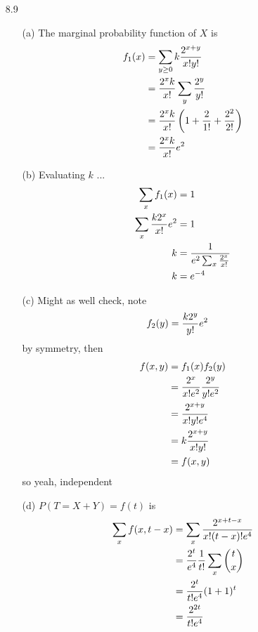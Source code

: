 \documentclass[english, 11pt]{article}
\begin{document}
\begin{itemize}
    \item[8.9]
    \begin{itemize}
      \item[(a)] The marginal probability function of $X$ is
      \begin{align*}
        f_1(x) & = \sum_{y \geq 0} k \frac{2^{x+y}}{x!y!} \\
               & = \frac{2^xk}{x!} \sum_y \frac{2^y}{y!} \\
               & = \frac{2^xk}{x!} \left( 1 + \frac{2}{1!} + \frac{2^2}{2!}  \right) \\
               & = \frac{2^xk}{x!} e^2
      \end{align*}
      \item[(b)] Evaluating $k$ ...
      \begin{align*}
        \sum_x f_1(x) & = 1 \\
        \sum_x \frac{k2^x}{x!} e^2 & = 1 \\
        k & = \frac{1}{e^2\sum_x \frac{2^x}{x!}} \\
        k & = e^{-4}
      \end{align*}
      \item[(c)] Might as well check, note
      \begin{align*}
        f_2(y) & = \frac{k2^y}{y!}e^2
      \end{align*}
      by symmetry, then
      \begin{align*}
        f(x,y) & = f_1(x)f_2(y) \\
               & = \frac{2^x}{x!e^2}\frac{2^y}{y!e^2} \\
               & = \frac{2^{x+y}}{x!y!e^4} \\
               & = k\frac{2^{x+y}}{x!y!} \\
               & = f(x,y)
      \end{align*}
      so yeah, independent
      \item[(d)] $P(T = X + Y) = f(t)$ is
      \begin{align*}
        \sum_x f(x, t-x) & = \sum_x \frac{2^{x + t - x}}{x!(t-x)!e^4} \\
        & = \frac{2^t}{e^4} \frac{1}{t!} \sum_x {t \choose x} \\
        & = \frac{2^t}{t!e^4} (1 + 1)^t \\
        & = \frac{2^{2t}}{t!e^4}
      \end{align*}
    \end{itemize}


\end{itemize}
\end{document}
